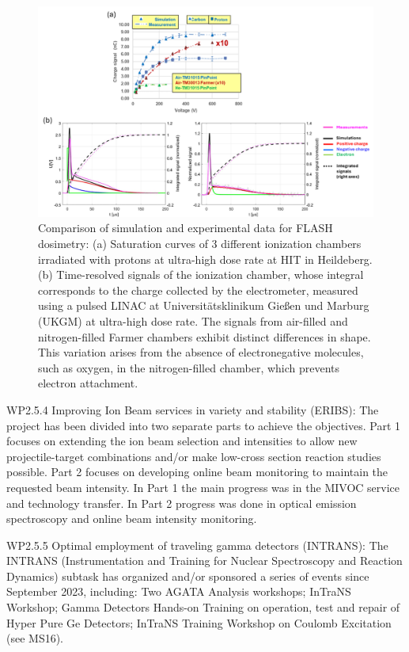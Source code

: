 \begin{figure}[!h]
    \centering
    \includegraphics[width=1.0\linewidth]{graphics/FLASH1.png}
    \caption{Comparison of simulation and experimental data for FLASH dosimetry:
(a) Saturation curves of 3 different ionization chambers irradiated with protons at ultra-high dose rate at HIT in Heildeberg. (b) Time-resolved signals of the ionization chamber, whose integral corresponds to the charge collected by the electrometer, measured using a pulsed LINAC at Universitätsklinikum Gießen und Marburg (UKGM) at ultra-high dose rate. The signals from air-filled and nitrogen-filled Farmer chambers exhibit distinct differences in shape. This variation arises from the absence of electronegative molecules, such as oxygen, in the nitrogen-filled chamber, which prevents electron attachment.
}
    \label{fig:FLASH1}
\end{figure}

WP2.5.4 Improving Ion Beam services in variety and stability (ERIBS): The project has been divided into two separate parts to achieve the objectives. Part 1 focuses on extending the ion beam selection and intensities to allow new projectile-target combinations and/or make low-cross section reaction studies possible. Part 2 focuses on developing online beam monitoring to maintain the requested beam intensity. In Part 1 the main progress was in the MIVOC service and technology transfer. In Part 2 progress was done in optical emission spectroscopy and online beam intensity monitoring.

WP2.5.5 Optimal employment of traveling gamma detectors (INTRANS): The INTRANS (Instrumentation and Training for Nuclear Spectroscopy and Reaction Dynamics) subtask has organized and/or sponsored a series of events since September 2023, including: Two AGATA Analysis workshops; InTraNS Workshop; Gamma Detectors Hands-on Training on operation, test and repair of Hyper Pure Ge Detectors; InTraNS Training Workshop on Coulomb Excitation (see MS16). 

